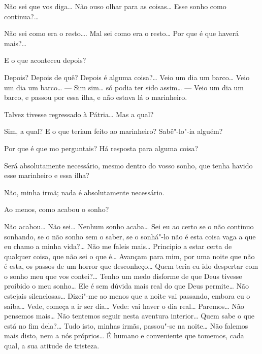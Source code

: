  Não sei que vos
diga\ldots{} Não ouso olhar para as coisas\ldots{} 
Esse sonho como continua?\ldots{} 

 Não sei como era o resto\ldots{}.
Mal sei como era o resto\ldots{} Por que é que haverá mais?\ldots{}

 E o que aconteceu depois?

 Depois? Depois de quê? Depois é
alguma coisa?\ldots{} Veio um dia
um barco\ldots{} Veio um dia um barco\ldots{} 
--- Sim sim\ldots{} só podia ter sido
assim\ldots{} --- Veio um dia um barco,
e passou por essa ilha, e não estava
lá o marinheiro.

 Talvez tivesse regressado à Pátria\ldots{} 
Mas a qual?

 Sim, a qual? E o que teriam feito ao marinheiro?
Sabê"-lo"-ia alguém?

 Por que é que mo perguntais?
Há resposta para alguma coisa?

\hfill{} 				\EP[]

 Será absolutamente necessário,
mesmo dentro do vosso sonho,
que tenha havido esse marinheiro e essa ilha?

 Não, minha irmã; nada é absolutamente necessário.

 Ao menos, como acabou o sonho?

 Não acabou\ldots{} Não sei\ldots{} 
Nenhum sonho acaba\ldots{} Sei eu ao certo
se o não continuo sonhando, se o não sonho 
sem o saber, se o sonhá"-lo
não é esta coisa vaga a que eu chamo a minha vida?\ldots{}
Não me faleis mais\ldots{} Principio a estar certa de 
qualquer coisa, que não sei o que
é\ldots{} Avançam para mim, por uma noite que
não é esta, os passos de um
horror que desconheço\ldots{} Quem teria eu
ido despertar com o sonho meu
que vos contei?\ldots{} Tenho um medo 
disforme de que Deus tivesse proibido
o meu sonho\ldots{} Ele é sem dúvida mais
real do que Deus permite\ldots{} Não
estejais silenciosas\ldots{} Dizei"-me ao
menos que a noite vai passando,
embora eu o saiba\ldots{} Vede, começa a ir ser dia\ldots{}
Vede: vai haver o dia real\ldots{} Paremos\ldots{} 
Não pensemos mais\ldots{} Não tentemos seguir nesta
aventura interior\ldots{} Quem sabe o que está
no fim dela?\ldots{} Tudo isto,
minhas irmãs, passou"-se na noite\ldots{}
Não falemos mais disto, nem a nós
próprios\ldots{} É humano e conveniente que 
tomemos, cada qual, a sua atitude de tristeza.

